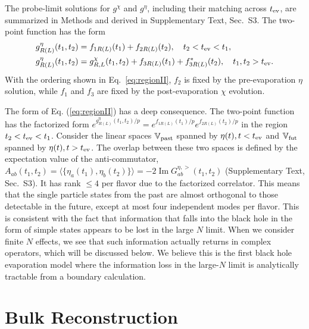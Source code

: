 \documentclass[pdflatex,sn-nature]{sn-jnl}
\begin{document}
The probe-limit solutions for \(g^\chi\) and \(g^\eta\), including their matching across \(t_{\rm ev}\), are summarized in Methods and derived in Supplementary Text, Sec.~S3. The two-point function has the form
\begin{align}
g^\eta_{R(L)}(t_1,t_2)
&=f_{1R(L)}(t_1)+f_{2R(L)}(t_2),
\quad t_2<t_{\rm ev}<t_1,\label{eq:regionII}\\
g^\eta_{R(L)}(t_1,t_2)
&=g^\chi_{R,L}(t_1,t_2)+f_{3R(L)}(t_1)+f^*_{3R(L)}(t_2),
\quad t_1,t_2>t_{\rm ev}.\label{eq:regionIII}
\end{align}
With the ordering shown in Eq.~\eqref{eq:regionII}, \(f_2\) is fixed by the pre-evaporation $\eta$ solution, while \(f_1\) and \(f_3\) are fixed by the post-evaporation $\chi$ evolution.

The form of Eq. (\ref{eq:regionII}) has a deep consequence. The two-point function has the factorized form $e^{g^\eta_{R(L)}(t_1,t_2)/p}=e^{f_{1R(L)}(t_1)/p}e^{f_{2R(L)}(t_2)/p}$ in the region $t_2<t_{\rm ev}<t_1$. Consider the linear spaces $\mathbb{V}_{\rm past}$ spanned by $\eta(t),t<t_{\rm ev}$ and $\mathbb{V}_{\rm fut}$ spanned by $\eta(t),t>t_{\rm ev}$. The overlap between these two spaces is defined by the expectation value of the anti-commutator, $A_{ab}(t_1,t_2)=\langle\{\eta_a(t_1),\eta_b(t_2)\}\rangle=-2\operatorname{Im}G^{\eta,>}_{ab}(t_1,t_2)$ (Supplementary Text, Sec.~S3). It has rank $\leq4$ per flavor due to the factorized correlator. This means that the single particle states from the past are almost orthogonal to those detectable in the future, except at most four independent modes per flavor. This is consistent with the fact that information that falls into the black hole in the form of simple states appears to be lost in the large $N$ limit. When we consider finite $N$ effects, we see that such information actually returns in complex operators, which will be discussed below.
We believe this is the first black hole evaporation model where the information loss in the large-$N$ limit is analytically tractable from a boundary calculation.

\section{Bulk Reconstruction}
\end{document}
